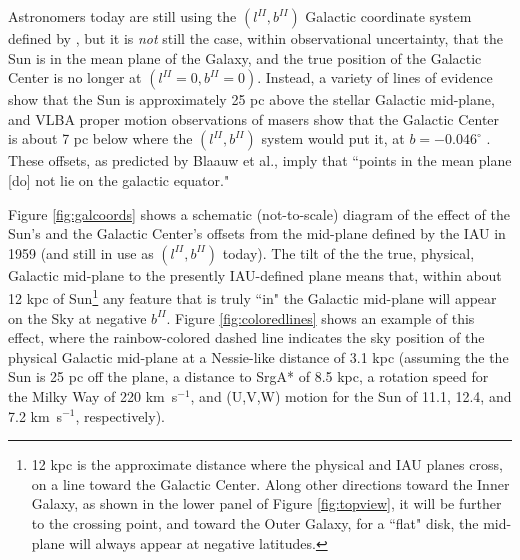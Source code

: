 Astronomers today are still using the $(l^{II}, b^{II})$ Galactic coordinate system defined by
\citet{Blaauw1959}, but it is \emph{not} still the case, within observational uncertainty, that the
Sun is in the mean plane of the Galaxy, and the true position of the Galactic Center is no longer at $(l^{II}=0, b^{II}=0)$.
Instead, a variety of lines of evidence \citep{Chen2001b,Maiz-Apellaniz2001a,Juric2008a} show that the Sun is approximately 25 pc above the stellar Galactic mid-plane, and VLBA proper motion observations of masers show that the Galactic Center is about 7 pc below where the $(l^{II}, b^{II})$ system would put it, at $b=-0.046^\circ$ \citep{Reid2004}.   These offsets, as predicted by Blaauw et al., imply that ``points in the mean plane [do] not lie on the galactic equator."

Figure \ref{fig:galcoords} shows a schematic (not-to-scale) diagram of the effect of the Sun's and the Galactic Center's offsets from the  mid-plane defined by the IAU in 1959 (and still in use as $(l^{II}, b^{II})$ today).  The tilt of the the true, physical, Galactic mid-plane to the presently IAU-defined plane means that, within about 12 kpc of Sun\footnote{12 kpc is the approximate distance where the physical and IAU planes cross, on a line toward the Galactic Center.  Along other directions toward the Inner Galaxy, as shown in the lower panel of Figure \ref{fig:topview}, it will be further to the crossing point, and toward the Outer Galaxy, for a ``flat" disk, the mid-plane will always appear at negative latitudes.} any feature that is truly ``in" the Galactic mid-plane will appear on the Sky at negative $b^{II}$.  Figure \ref{fig:coloredlines} shows an example of this effect, where the rainbow-colored dashed line indicates the sky position of the physical Galactic mid-plane at a Nessie-like distance of 3.1 kpc (assuming the the Sun is 25 pc off the plane, a distance to SrgA* of 8.5 kpc, a rotation speed for the Milky Way of 220 km\ s$^{-1}$, and (U,V,W) motion for the Sun of 11.1, 12.4, and 7.2 km\ s$^{-1}$, respectively).